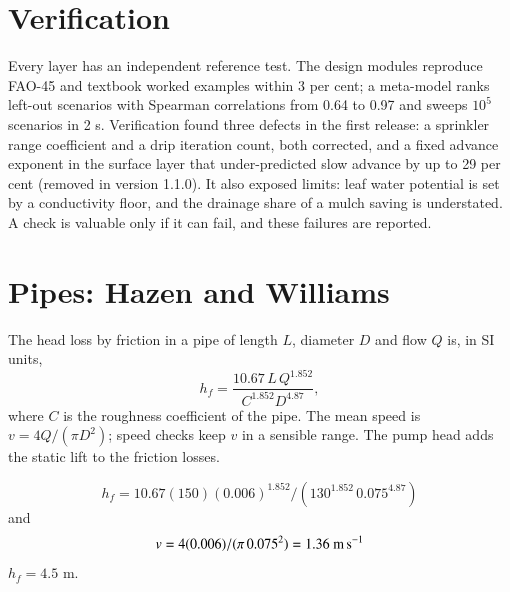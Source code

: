 \section{Verification}
Every layer has an independent reference test. The design modules reproduce FAO-45 and textbook worked examples within 3 per cent; a meta-model ranks left-out scenarios with Spearman correlations from 0.64 to 0.97 and sweeps $10^{5}$ scenarios in 2 s. Verification found three defects in the first release: a sprinkler range coefficient and a drip iteration count, both corrected, and a fixed advance exponent in the surface layer that under-predicted slow advance by up to 29 per cent (removed in version 1.1.0). It also exposed limits: leaf water potential is set by a conductivity floor, and the drainage share of a mulch saving is understated. A check is valuable only if it can fail, and these failures are reported.


\section{Pipes: Hazen and Williams}
The head loss by friction in a pipe of length $L$, diameter $D$ and flow $Q$ is, in SI units,
\begin{equation}\label{eq:hw}\boxed{h_f=\frac{10.67\,L\,Q^{1.852}}{C^{1.852}D^{4.87}},}\end{equation}
where $C$ is the roughness coefficient of the pipe. The mean speed is $v=4Q/(\pi D^2)$; speed checks keep $v$ in a sensible range. The pump head adds the static lift to the friction losses.





\sol {}\ans \[h_f=10.67(150)(0.006)^{1.852}/(130^{1.852}\,0.075^{4.87})\] and \[v=4(0.006)/(\pi\,0.075^2)=1.36\ \text{m\,s$^{-1}$}\]
$h_f=4.5$ m. \finans

